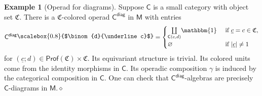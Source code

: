 \documentclass{amsbook}
\numberwithin{section}{chapter}
\numberwithin{subsection}{section}
\numberwithin{equation}{section}
\theoremstyle{plain}
\theoremstyle{definition}
\newtheorem{example}[equation]{Example}
\newcommand{\colorc}{\mathfrak{C}}
\newcommand{\Prof}{\mathsf{Prof}}
\newcommand{\Profc}{\Prof(\colorc)}
\newcommand{\Profcc}{\Profc \times \colorc}
\newcommand{\C}{\mathsf{C}}
\newcommand{\M}{\mathsf{M}}
\newcommand{\tensorunit}{\mathbbm{1}}
\newcommand{\coprodover}[1]{\underset{#1}{\coprod}}
\newcommand{\dqed}{\hfill$\diamond$}
\newcommand{\Cdiag}{\C^{\mathsf{diag}}}
\newcommand{\uc}{\underline c}
\newcommand{\smallprof}[1]
{\raisebox{.05cm}{\scalebox{0.8}{#1}}}
\newcommand{\duc}{\smallprof{$\binom{d}{\uc}$}}
\begin{document}
\begin{example}[Operad for diagrams]\label{ex:operad-diag}
Suppose $\C$ is a small category with object set $\colorc$.  There is a $\colorc$-colored operad $\Cdiag$ in $\M$ with entries
\[\Cdiag\duc = \begin{cases} \coprodover{\C(c,d)}\tensorunit & \text{ if $\uc=c \in \colorc$},\\ \varnothing & \text{ if $|\uc|\not=1$}\end{cases}\]
for $(\uc;d) \in \Profcc$.  Its equivariant structure is trivial.  Its colored units come from the identity morphisms in $\C$.  Its operadic composition $\gamma$ is induced by the categorical composition in $\C$.  One can check that $\Cdiag$-algebras are precisely $\C$-diagrams in $\M$.\dqed
\end{example}
\end{document}

